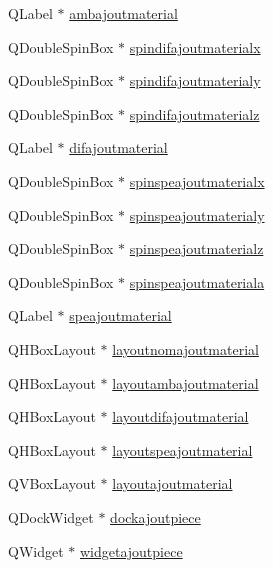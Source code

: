 \begin{DoxyCompactItemize}
\item 
Q\+Label $\ast$ \hyperlink{class_main_window_aea5950c7b756106a6a68c766352676bb}{ambajoutmaterial}
\item 
Q\+Double\+Spin\+Box $\ast$ \hyperlink{class_main_window_a350c852e60398b5e1d8923666a19f4a8}{spindifajoutmaterialx}
\item 
Q\+Double\+Spin\+Box $\ast$ \hyperlink{class_main_window_ac8938b333422d475686212a6da6f8592}{spindifajoutmaterialy}
\item 
Q\+Double\+Spin\+Box $\ast$ \hyperlink{class_main_window_adbf1bc80b252c00419abec7da5e19913}{spindifajoutmaterialz}
\item 
Q\+Label $\ast$ \hyperlink{class_main_window_a8bbcda89f3ac6367c000056b7e6acb5f}{difajoutmaterial}
\item 
Q\+Double\+Spin\+Box $\ast$ \hyperlink{class_main_window_a41b46a41873912e43f60feafeec48f2f}{spinspeajoutmaterialx}
\item 
Q\+Double\+Spin\+Box $\ast$ \hyperlink{class_main_window_af5f3e81215640c685afbe36ea30926eb}{spinspeajoutmaterialy}
\item 
Q\+Double\+Spin\+Box $\ast$ \hyperlink{class_main_window_abfa1370458910b22754b3a2f9dcf8079}{spinspeajoutmaterialz}
\item 
Q\+Double\+Spin\+Box $\ast$ \hyperlink{class_main_window_ada80e183d94aca69af5b4b413b283a41}{spinspeajoutmateriala}
\item 
Q\+Label $\ast$ \hyperlink{class_main_window_a464561ddbc54d9ced72ad2e1bd76c582}{speajoutmaterial}
\item 
Q\+H\+Box\+Layout $\ast$ \hyperlink{class_main_window_adf5b4cec63e1fb74cfa99d9ff9e72b8d}{layoutnomajoutmaterial}
\item 
Q\+H\+Box\+Layout $\ast$ \hyperlink{class_main_window_ac7c260f905c9235339c200e7fa4e6258}{layoutambajoutmaterial}
\item 
Q\+H\+Box\+Layout $\ast$ \hyperlink{class_main_window_acf1014fb28677dc578d33bf3c4b8729b}{layoutdifajoutmaterial}
\item 
Q\+H\+Box\+Layout $\ast$ \hyperlink{class_main_window_adac5730b1a8e83ec6c59d531d9f7ba4e}{layoutspeajoutmaterial}
\item 
Q\+V\+Box\+Layout $\ast$ \hyperlink{class_main_window_a377ec350ecc66336f8d5540670999b3a}{layoutajoutmaterial}
\item 
Q\+Dock\+Widget $\ast$ \hyperlink{class_main_window_a6a303ea101c20af7884bb398bd3dc41f}{dockajoutpiece}
\item 
Q\+Widget $\ast$ \hyperlink{class_main_window_a81a3c7e272f0bc32762ef85575fe271d}{widgetajoutpiece}

\end{DoxyCompactItemize}
